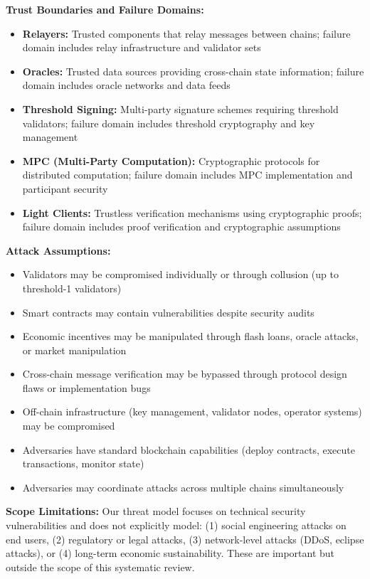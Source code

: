 \documentclass[runningheads]{llncs}
\begin{document}
\textbf{Trust Boundaries and Failure Domains:}
\begin{itemize}
    \item \textbf{Relayers:} Trusted components that relay messages between chains; failure domain includes relay infrastructure and validator sets
    \item \textbf{Oracles:} Trusted data sources providing cross-chain state information; failure domain includes oracle networks and data feeds
    \item \textbf{Threshold Signing:} Multi-party signature schemes requiring threshold validators; failure domain includes threshold cryptography and key management
    \item \textbf{MPC (Multi-Party Computation):} Cryptographic protocols for distributed computation; failure domain includes MPC implementation and participant security
    \item \textbf{Light Clients:} Trustless verification mechanisms using cryptographic proofs; failure domain includes proof verification and cryptographic assumptions
\end{itemize}

\textbf{Attack Assumptions:}
\begin{itemize}
    \item Validators may be compromised individually or through collusion (up to threshold-1 validators)
    \item Smart contracts may contain vulnerabilities despite security audits
    \item Economic incentives may be manipulated through flash loans, oracle attacks, or market manipulation
    \item Cross-chain message verification may be bypassed through protocol design flaws or implementation bugs
    \item Off-chain infrastructure (key management, validator nodes, operator systems) may be compromised
    \item Adversaries have standard blockchain capabilities (deploy contracts, execute transactions, monitor state)
    \item Adversaries may coordinate attacks across multiple chains simultaneously
\end{itemize}

\textbf{Scope Limitations:}
Our threat model focuses on technical security vulnerabilities and does not explicitly model: (1) social engineering attacks on end users, (2) regulatory or legal attacks, (3) network-level attacks (DDoS, eclipse attacks), or (4) long-term economic sustainability. These are important but outside the scope of this systematic review.
\end{document}
